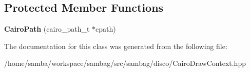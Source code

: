 \subsection*{Protected Member Functions}
\begin{DoxyCompactItemize}
\item 
\hypertarget{classsambag_1_1disco_1_1_cairo_path_abfd8a25835341546ae24717e8eef30f3}{
{\bfseries CairoPath} (cairo\_\-path\_\-t $\ast$cpath)}
\label{classsambag_1_1disco_1_1_cairo_path_abfd8a25835341546ae24717e8eef30f3}

\end{DoxyCompactItemize}


The documentation for this class was generated from the following file:\begin{DoxyCompactItemize}
\item 
/home/samba/workspace/sambag/src/sambag/disco/CairoDrawContext.hpp\end{DoxyCompactItemize}
